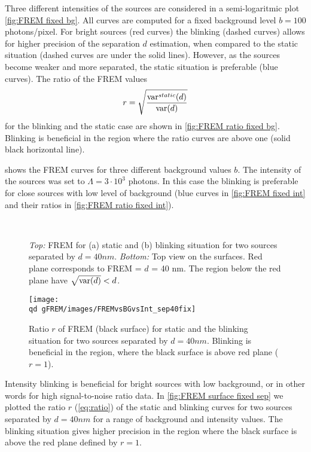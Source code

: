 Three different intensities of the sources are considered in a semi-logaritmic plot \autoref{fig:FREM fixed bg}. All curves are computed for a fixed background level $b=100$ photons/pixel. For bright sources (red curves) the blinking (dashed curves) allows for higher precision of the separation $d$ estimation, when compared to the static situation (dashed curves are under the solid lines). However, as the sources become weaker and more separated, the static situation is preferable (blue curves). The ratio of the FREM values
%
\begin{equation}
	r=\sqrt{\frac{\mathrm{var}^{static}(d)}{\mathrm{var}(d)}}
	\label{eq:ratio}
\end{equation} 
%
for the blinking and the static case are shown in \autoref{fig:FREM ratio fixed bg}. Blinking is beneficial in the region where the ratio curves are above one (solid black horizontal line).

 shows the FREM curves for three different background values $b$. The intensity of the sources was set to $\Lambda =3\cdot 10^3$ photons. In this case the blinking is preferable for close sources with low level of background (blue curves in \autoref{fig:FREM fixed int} and their ratios in  \autoref{fig:FREM ratio fixed int}). 

\begin{figure}[!hbt]
	\centering
	\newcommand{\wf}{.48\textwidth}
	\\

	\caption{{\it Top:} FREM for (a) static and (b) blinking situation for two sources separated by $d=40\unit{nm}$. {\it Bottom:} Top view on the surfaces. Red plane corresponds to FREM = $d$ = 40 nm. The region below the red plane have $\sqrt{\mathrm{var}(d)}<d$.}
	\label{fig:}
\end{figure}


\begin{figure}[!hbt]
	\centering
	\newcommand{\wf}{.8\textwidth}
	\texttt{[image: \\qd gFREM/images/FREMvsBGvsInt\_sep40fix]}
	\caption{Ratio $r$ of FREM (black surface) for static and the blinking situation for two sources separated by $d=40\unit{nm}$. Blinking is beneficial in the region, where the black surface is above red plane ($r=1$).}
	\label{fig:FREM surface fixed sep}
\end{figure}
%
Intensity blinking is beneficial for bright sources with low background, or in other words for high signal-to-noise ratio data. In \autoref{fig:FREM surface fixed sep} we plotted the ratio $r$ (\autoref{eq:ratio}) of the static and blinking curves for two sources separated by $d=40\unit{nm}$ for a range of background and intensity values. The blinking situation gives higher precision in the region where the black surface is above the red plane defined by $r=1$. 


